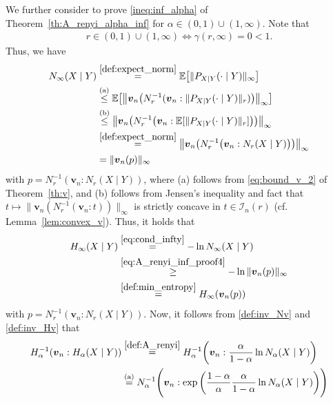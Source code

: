 \documentclass[conference, draftcls, onecolumn]{IEEEtran}
\theoremstyle{plain}
\newcommand{\bvec}[1]{\boldsymbol{#1}}
\newcommand{\lemref}[1]{Lemma~\ref{#1}}
\newcommand{\thref}[1]{Theorem~\ref{#1}}
\begin{document}
\begin{IEEEproof}[Proof of \thref{th:A_renyi_alpha_inf}]
We further consider to prove \eqref{ineq:inf_alpha} of \thref{th:A_renyi_alpha_inf} for $\alpha \in (0, 1) \cup (1, \infty)$.
Note that
\begin{align}
r \in (0, 1) \cup (1, \infty)
\iff
\gamma( r, \infty ) = 0 < 1 .
\end{align}
Thus, we have
\begin{align}
N_{\infty}(X \mid Y)
& \overset{\eqref{def:expect_norm}}{=}
\mathbb{E}\big[ \| P_{X|Y}(\cdot \mid Y) \|_{\infty} \big]
\\
& \overset{\text{(a)}}{\le}
\mathbb{E}\big[ \big\| \bvec{v}_{n}\big( N_{r}^{-1}(\bvec{v}_{n} : \| P_{X|Y}(\cdot \mid Y) \|_{r} ) \big) \big\|_{\infty} \big]
\\
& \overset{\text{(b)}}{\le}
\big\| \bvec{v}_{n}\big( N_{r}^{-1}\big(\bvec{v}_{n} : \mathbb{E}[ \| P_{X|Y}(\cdot \mid Y) \|_{r} ] \big) \big) \big\|_{\infty}
\\
& \overset{\eqref{def:expect_norm}}{=}
\big\| \bvec{v}_{n}\big( N_{r}^{-1}\big(\bvec{v}_{n} : N_{r}(X \mid Y) \big) \big) \big\|_{\infty}
\\
& =
\| \bvec{v}_{n}( p ) \|_{\infty}
\label{eq:A_renyi_inf_proof4}
\end{align}
with $p = N_{r}^{-1}(\bvec{v}_{n} : N_{r}(X \mid Y) )$, where (a) follows from \eqref{eq:bound_v_2} of \thref{th:v}, and (b) follows from Jensen's inequality and fact that $t \mapsto \| \bvec{v}_{n}( N_{r}^{-1}( \bvec{v}_{n} : t ) ) \|_{\infty}$ is strictly concave in $t \in \mathcal{I}_{n}( r )$ (cf. \lemref{lem:convex_v}).
Thus, it holds that
\begin{align}
H_{\infty}(X \mid Y)
& \overset{\eqref{eq:cond_infty}}{=}
- \ln N_{\infty}(X \mid Y)
\\
& \overset{\eqref{eq:A_renyi_inf_proof4}}{\ge}
- \ln \| \bvec{v}_{n}( p ) \|_{\infty}
\\
& \overset{\eqref{def:min_entropy}}{=}
H_{\infty}( \bvec{v}_{n}( p ) )
\label{eq:A_renyi_inf_proof5}
\end{align}
with $p = N_{r}^{-1}(\bvec{v}_{n} : N_{r}(X \mid Y) )$.
Now, it follows from \eqref{def:inv_Nv} and \eqref{def:inv_Hv} that
\begin{align}
H_{\alpha}^{-1}( \bvec{v}_{n} : H_{\alpha}(X \mid Y) )
& \overset{\eqref{def:A_renyi}}{=}
H_{\alpha}^{-1} \bigg( \bvec{v}_{n} : \frac{ \alpha }{ 1 - \alpha } \ln N_{\alpha}(X \mid Y) \bigg)
\\
& \overset{\text{(a)}}{=}
N_{\alpha}^{-1}\Bigg( \bvec{v}_{n} : \exp \bigg( \frac{ 1 - \alpha }{ \alpha } \frac{ \alpha }{ 1 - \alpha} \ln N_{\alpha}(X \mid Y) \bigg) \Bigg)

\end{align}
\end{IEEEproof}
\end{document}
